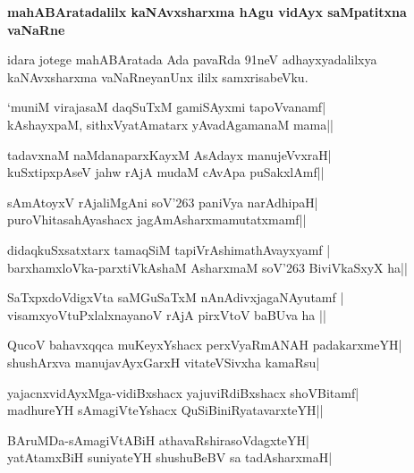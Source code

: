 \textbf{mahABAratadalilx kaNAvxsharxma hAgu vidAyx saMpatitxna vaNaRne}

idara jotege mahABAratada Ada pavaRda 91neV adhayxyadalilxya kaNAvxsharxma vaNaRneyanUnx ililx samxrisabeVku.

\begin{shloka}
`muniM virajasaM daqSuTxM gamiSAyxmi tapoVvanamf|\\
kAshayxpaM, sithxVyatAmatarx yAvadAgamanaM mama||
\end{shloka}

\begin{shloka}
tadavxnaM naMdanaparxKayxM AsAdayx manujeVvxraH|\\
kuSxtipxpAseV ja{hw} rAjA mudaM cAvApa puSakxlAmf||
\end{shloka}

\begin{shloka}
sAmAtoyxV rAjaliMgAni soV\char'263 paniVya narAdhipaH|\\
puroVhitasahAyashacx jagAmAsharxmamutatxmamf||
\end{shloka}

\begin{shloka}
didaqkuSxsatxtarx tamaqSiM tapiVrAshimathAvayxyamf |\\
barxhamxloVka-parxtiVkAshaM AsharxmaM soV\char'263 BiviVkaSxyX ha||
\end{shloka}

\begin{shloka}
SaTxpxdoVdigxVta saMGuSaTxM nAnAdivxjagaNAyutamf |\\
visamxyoVtuPxlalxnayanoV rAjA pirxVtoV baBUva ha ||
\end{shloka}

\begin{shloka}
QucoV bahavxqqca muKeyxYshacx perxVyaRmANAH padakarxmeYH|\\
shushArxva manujavAyxGarxH vitateVSivxha kamaRsu|
\end{shloka}

\begin{shloka}
yajacnxvidAyxMga-vidiBxshacx yajuviRdiBxshacx shoVBitamf|\\
madhureYH sAmagiVteYshacx QuSiBiniRyatavarxteYH||
\end{shloka}

\begin{shloka}
BAruMDa-sAmagiVtABiH athavaRshirasoVdagxteYH|\\
yatAtamxBiH suniyateYH shushuBeBV sa tadAsharxmaH|
\end{shloka}

